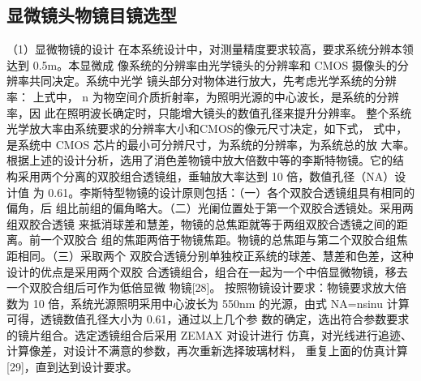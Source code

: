 \subsection{显微镜头物镜目镜选型}
（1）显微物镜的设计 在本系统设计中，对测量精度要求较高，要求系统分辨本领达到 0.5m。本显微成 像系统的分辨率由光学镜头的分辨率和 CMOS 摄像头的分辨率共同决定。系统中光学 镜头部分对物体进行放大，先考虑光学系统的分辨率：
上式中， n 为物空间介质折射率，为照明光源的中心波长，是系统的分辨率，因 此在照明波长确定时，只能增大镜头的数值孔径来提升分辨率。 整个系统光学放大率由系统要求的分辨率大小和CMOS的像元尺寸决定，如下式，
式中，是系统中 CMOS 芯片的最小可分辨尺寸，为系统的分辨率，为系统总的放 大率。 根据上述的设计分析，选用了消色差物镜中放大倍数中等的李斯特物镜。它的结 构采用两个分离的双胶组合透镜组，垂轴放大率达到 10 倍，数值孔径（NA）设计值 为 0.61。李斯特型物镜的设计原则包括：（一）各个双胶合透镜组具有相同的偏角，后 组比前组的偏角略大。（二）光阑位置处于第一个双胶合透镜处。采用两组双胶合透镜 来抵消球差和慧差，物镜的总焦距就等于两组双胶合透镜之间的距离。前一个双胶合 组的焦距两倍于物镜焦距。物镜的总焦距与第二个双胶合组焦距相同。（三）采取两个 双胶合透镜分别单独校正系统的球差、慧差和色差，这种设计的优点是采用两个双胶 合透镜组合，组合在一起为一个中倍显微物镜，移去一个双胶合组后可作为低倍显微 物镜[28]。 按照物镜设计要求：物镜要求放大倍数为 10 倍，系统光源照明采用中心波长为 550nm 的光源，由式 NA=nsinu 计算可得，透镜数值孔径大小为 0.61，通过以上几个参 数的确定，选出符合参数要求的镜片组合。选定透镜组合后采用 ZEMAX 对设计进行 仿真，对光线进行追迹、计算像差，对设计不满意的参数，再次重新选择玻璃材料， 重复上面的仿真计算[29]，直到达到设计要求。

